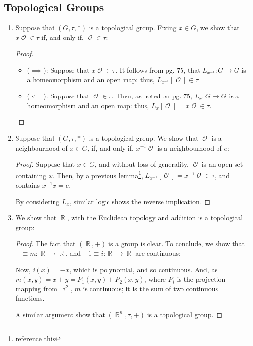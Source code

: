 \documentclass{book}
\DeclareMathOperator*{\R}{\mathbb{R}}
\DeclareMathOperator*{\Ocal}{\mathcal{O}}
\begin{document}
\subsection{Topological Groups} \label{chap:sec:sub:topologicalgroups}
\begin{enumerate}[(1)]

    \item Suppose that $(G, \tau, *)$ is a topological group. Fixing $x \in G$, we show that $x{\Ocal}\in \tau$ if, and only if, ${\Ocal} \in \tau$: 
        \begin{proof} 
            $ $\newline
            \begin{itemize}
                \item [] ($\implies$): Suppose that $x{\Ocal} \in \tau$. It follows from pg. $75$, that $L_{x^{-1}}: G \rightarrow G$ is a homeomorphism and an open map: thus, $L_{x^{-1}}[{\Ocal}] \in \tau$.
                \item [] ($\impliedby$): Suppose that ${\Ocal} \in \tau$. Then, as noted on pg. $75$, $L_x: G \rightarrow G$ is a homeomorphism and an open map: thus, $L_x[{\Ocal}] = x{\Ocal} \in \tau$.  
            \end{itemize}
        \end{proof}

    \item Suppose that $(G, \tau, *)$ is a topological group. We show that ${\Ocal}$ is a neighbourhood of $x \in G$, if, and only if, $x^{-1}{\Ocal}$ is a neighbourhood of $e$: 
        \begin{proof} Suppose that $x \in G$, and without loss of generality, ${\Ocal}$ is an open set containing $x$. Then, by a previous lemma\footnote{reference this}, $L_{x^{-1}}[{\Ocal}] = x^{-1}{\Ocal} \in \tau$, and contains $x^{-1}x = e$.
            \par By considering $L_x$, similar logic shows the reverse implication. 
        \end{proof}

    \item We show that $\R$, with the Euclidean topology and addition is a topological group: 
        \begin{proof} The fact that $(\R, +)$ is a group is clear. To conclude, we show that $+ \equiv m:\R \rightarrow \R$, and $-1 \equiv i: \R \rightarrow \R$ are continuous:
            \par Now, $i(x) = -x$, which is polynomial, and so continuous. And, as $m(x,y) = x + y = P_1(x,y) + P_2(x,y)$, where $P_i$ is the projection mapping from $\R^{2}$, $m$ is continuous; it is the sum of two continuous functions. 
            \par A similar argument show that $(\R^{n}, \tau, +)$ is a topological group.
        \end{proof}


\end{enumerate}
\end{document}
